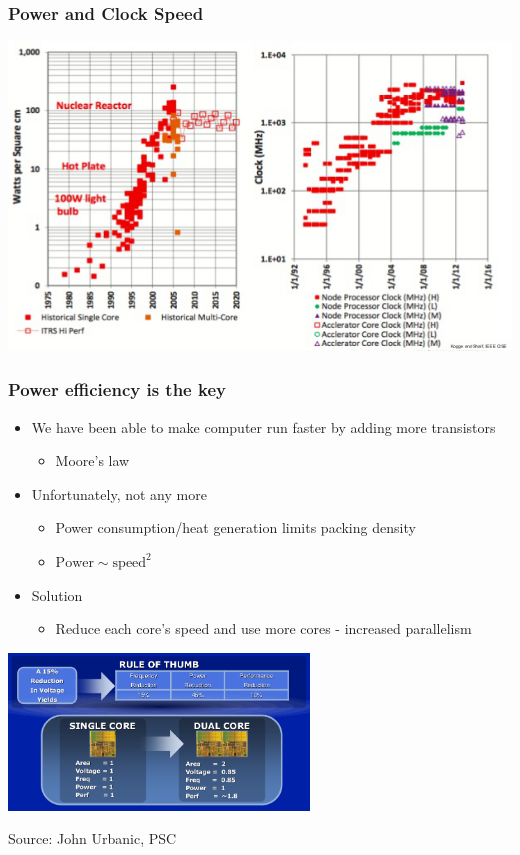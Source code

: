 \documentclass[10pt,t]{beamer}
\begin{document}
\begin{frame}
\frametitle{Power and Clock Speed}
\includegraphics[width=\textwidth]{./CPUheat}
\end{frame}

\begin{frame}
\frametitle{Power efficiency is the key}
\begin{itemize}
\item We have been able to make computer run faster by adding more transistors
\begin{itemize}
\item Moore's law
\end{itemize}
\item Unfortunately, not any more
\begin{itemize}
\item Power consumption/heat generation limits packing density
\item $\mathrm{Power} \sim \mathrm{speed}^2$
\end{itemize}
\item Solution
\begin{itemize}
\item Reduce each core's speed and use more cores - increased
parallelism
\end{itemize}
\end{itemize}
\begin{center}
\includegraphics[width=0.6\textwidth]{./cpucore}

\tiny{Source: John Urbanic, PSC}
\end{center}
\end{frame}
\end{document}
